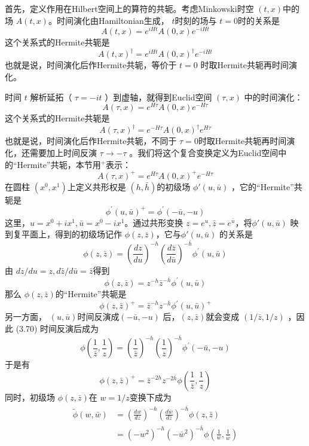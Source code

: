 首先，定义作用在Hilbert空间上的算符的共轭。考虑Minkowski时空 $(t,x) $中的场 $A(t,x) $。时间演化由Hamiltonian生成， $t $时刻的场与 $t=0 $时的关系是
$$
A(t, x)=e^{i H t} A(0, x) e^{-i H t}
$$
这个关系式的Hermite共轭是
$$
A(t, x)^{\dagger}=e^{i H t} A(0, x)^{\dagger} e^{-i H t}
$$
也就是说，时间演化后作Hermite共轭，等价于 $t=0$ 时取Hermite共轭再时间演化。

时间 $t$ 解析延拓（ $\tau=-i t$ ）到虚轴，就得到Euclid空间 $(\tau,x)$ 中的时间演化：
$$
A(\tau, x)=e^{H \tau} A(0, x) e^{-H \tau}
$$
这个关系式的Hermite共轭是
$$
A(\tau, x)^{\dagger}=e^{-H \tau} A(0, x)^{\dagger} e^{H \tau}
$$
也就是说，时间演化后作Hermite共轭，不同于 $\tau=0 $时取Hermite共轭再时间演化，还需要加上时间反演 $\tau \to -\tau$ 。我们将这个复合变换定义为Euclid空间中的“Hermite”共轭，本节用$ {}^+ $表示：
$$
A(\tau, x)^{+}=e^{H \tau} A(0, x)^{+} e^{-H \tau}
$$
在圆柱 $(x^0,x^1) $上定义共形权是 $(h,\bar{h}) $的初级场 $\phi'(u,\bar{u})$ ，它的“Hermite”共轭是
$$
\phi^{\prime}(u, \bar{u})^{+}=\phi^{\prime}(-\bar{u},-u)
$$
这里，$ u=x^{0}+i x^{1}, \bar{u}=x^{0}-i x^{1} $。通过共形变换 $z=e^{u}, \bar{z}=e^{\bar{u}} $，将$ \phi'(u,\bar{u})$ 映到复平面上，得到的初级场记作 $\phi(z,\bar{z}) $，它与$ \phi'(u,\bar{u})$ 的关系是
$$
\phi(z, \bar{z})=\left(\frac{d z}{d u}\right)^{-h}\left(\frac{d \bar{z}}{d \bar{u}}\right)^{-\bar{h}} \phi^{\prime}(u, \bar{u})
$$
由 $dz/du=z,d\bar{z}/d\bar{u}=\bar{z} $得到
\begin{equation}
	\phi(z, \bar{z})=z^{-h} \bar{z}^{-\bar{h}} \phi^{\prime}(u, \bar{u})
\end{equation}
那么 $\phi(z,\bar{z}) $的“Hermite”共轭是
$$
\phi(z, \bar{z})^{+}=\bar{z}^{-h} z^{-\bar{h}} \phi^{\prime}(u, \bar{u})^{+}
$$
另一方面， $(u,\bar{u}) $时间反演成$ (-\bar{u},-u)$ 后，$ (z,\bar{z}) $就会变成 $(1/\bar{z},1/z)$ ，因此 (3.70) 时间反演后成为
$$
\phi\left(\frac{1}{\bar{z}}, \frac{1}{z}\right)=\left(\frac{1}{\bar{z}}\right)^{-h}\left(\frac{1}{z}\right)^{-\bar{h}} \phi^{\prime}(-\bar{u}, -u)
$$
于是有
\begin{equation}
	\phi(z, \bar{z})^{+}=\bar{z}^{-2 h} z^{-2 \bar{h}} \phi\left(\frac{1}{\bar{z}}, \frac{1}{z}\right)
\end{equation}
同时，初级场 $\phi(z,\bar{z}) $在 $w=1/z $变换下成为
\begin{equation}
\begin{aligned} \tilde{\phi}(w, \bar{w}) &=\left(\frac{d w}{d z}\right)^{-h}\left(\frac{d \bar{w}}{d \bar{z}}\right)^{-\bar{h}} \phi(z, \bar{z}) \\ &=\left(-w^{2}\right)^{-h}\left(-\bar{w}^{2}\right)^{-\bar{h}} \phi\left(\frac{1}{w}, \frac{1}{\bar{w}}\right) \end{aligned}
\end{equation}
